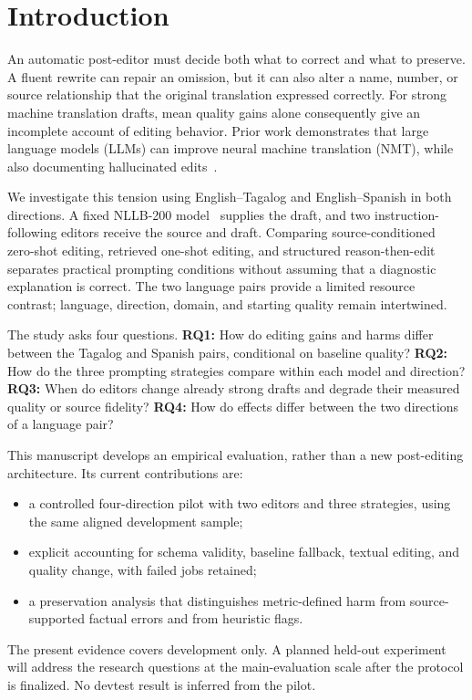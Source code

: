 \section{Introduction}
An automatic post-editor must decide both what to correct and what to preserve. A fluent rewrite can repair an omission, but it can also alter a name, number, or source relationship that the original translation expressed correctly. For strong machine translation drafts, mean quality gains alone consequently give an incomplete account of editing behavior. Prior work demonstrates that large language models (LLMs) can improve neural machine translation (NMT), while also documenting hallucinated edits~\cite{raunak2023}.

We investigate this tension using English--Tagalog and English--Spanish in both directions. A fixed NLLB-200 model~\cite{nllb2022} supplies the draft, and two instruction-following editors receive the source and draft. Comparing source-conditioned zero-shot editing, retrieved one-shot editing, and structured reason-then-edit separates practical prompting conditions without assuming that a diagnostic explanation is correct. The two language pairs provide a limited resource contrast; language, direction, domain, and starting quality remain intertwined.

The study asks four questions. \textbf{RQ1:} How do editing gains and harms differ between the Tagalog and Spanish pairs, conditional on baseline quality? \textbf{RQ2:} How do the three prompting strategies compare within each model and direction? \textbf{RQ3:} When do editors change already strong drafts and degrade their measured quality or source fidelity? \textbf{RQ4:} How do effects differ between the two directions of a language pair?

This manuscript develops an empirical evaluation, rather than a new post-editing architecture. Its current contributions are:
\begin{itemize}
\item a controlled four-direction pilot with two editors and three strategies, using the same aligned development sample;
\item explicit accounting for schema validity, baseline fallback, textual editing, and quality change, with failed jobs retained;
\item a preservation analysis that distinguishes metric-defined harm from source-supported factual errors and from heuristic flags.
\end{itemize}
The present evidence covers development only. A planned held-out experiment will address the research questions at the main-evaluation scale after the protocol is finalized. No devtest result is inferred from the pilot.
